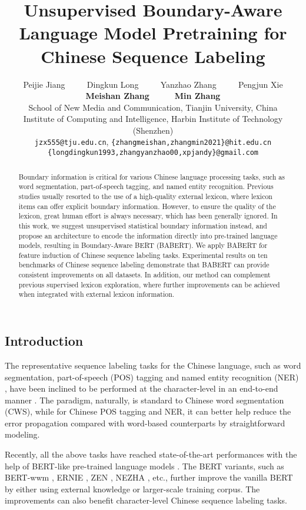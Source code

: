 \documentclass[11pt]{article}
\title{Unsupervised Boundary-Aware Language Model Pretraining for Chinese Sequence Labeling}
\author{
  Peijie Jiang ~~~~ Dingkun Long ~~~~ Yanzhao Zhang ~~~~ Pengjun Xie \\
  {\bf Meishan Zhang ~~~~ Min Zhang} \\
  School of New Media and Communication, Tianjin University, China\\
  Institute of Computing and Intelligence, Harbin Institute of Technology (Shenzhen)\\
  \texttt{jzx555@tju.edu.cn}, \texttt{\{zhangmeishan,zhangmin2021\}@hit.edu.cn}\\
  \texttt{\{longdingkun1993,zhangyanzhao00,xpjandy\}@gmail.com}\\
}
\begin{document}
\begin{CJK}{UTF8}{gbsn}

\maketitle
\begin{abstract}
  Boundary information is critical for various Chinese language processing tasks, such as word segmentation, part-of-speech tagging, and named entity recognition.
  Previous studies usually resorted to the use of a high-quality external lexicon, where lexicon items can offer explicit boundary information. 
  However, to ensure the quality of the lexicon, great human effort is always necessary, which has been generally ignored.  
  In this work, we suggest unsupervised statistical boundary information instead,   
  and propose an architecture to encode the information directly into pre-trained language models,
  resulting in Boundary-Aware BERT (BABERT).
  We apply BABERT for feature induction of Chinese sequence labeling tasks. 
  Experimental results on ten benchmarks of Chinese sequence labeling demonstrate that BABERT can provide consistent improvements on all datasets.
  In addition,
  our method can complement previous supervised lexicon exploration,
  where further improvements can be achieved when integrated with external lexicon information.


\end{abstract}

\section{Introduction}
The representative sequence labeling tasks for the Chinese language, such as word segmentation,
part-of-speech (POS) tagging and named entity recognition (NER) \cite{emerson-2005-second, jin-chen-2008-fourth},
have been inclined to be performed at the character-level in an end-to-end manner \cite{shen-etal-2016-consistent}.
The paradigm, naturally, is standard to Chinese word segmentation (CWS),
while for Chinese POS tagging and NER,
it can better help reduce the error propagation \cite{sun-uszkoreit-2012-capturing, Yang2016Combining, liu-etal-2019-encoding}
compared with word-based counterparts by straightforward modeling.





Recently, all the above tasks have reached state-of-the-art performances with the help of BERT-like pre-trained language models \cite{yan2019tener, meng2019glyce}.
The BERT variants, such as BERT-wwm \cite{cui2021pre}, ERNIE \cite{sun2019ernie}, ZEN \cite{diao-etal-2020-zen}, NEZHA \cite{wei2019nezha}, etc.,
further improve the vanilla BERT by either using external knowledge or larger-scale training corpus.
The improvements can also benefit character-level Chinese sequence labeling tasks.




\end{CJK}
\end{document}
